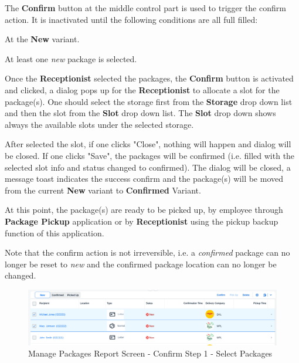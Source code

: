 The \textbf{Confirm} button at the middle control part is used to trigger the confirm action. It is inactivated until the following conditions are all full filled:

\begin{compactenum}
    \item At the \textbf{New} variant.
    \item At least one \textit{new} package is selected.
\end{compactenum}

\bigskip
Once the \textbf{Receptionist} selected the packages, the \textbf{Confirm} button is activated and clicked, a dialog pops up for the \textbf{Receptionist} to allocate a slot for the package(s). One should select the storage first from the \textbf{Storage} drop down list and then the slot from the \textbf{Slot} drop down list. The \textbf{Slot} drop down shows always the available slots under the selected storage.

After selected the slot, if one clicks "Close", nothing will happen and dialog will be closed. If one clicks "Save", the packages will be confirmed (i.e. filled with the selected slot info and status changed to confirmed). The dialog will be closed, a message toast indicates the success confirm and the package(s) will be moved from the current \textbf{New} variant to \textbf{Confirmed} Variant.

At this point, the package(s) are ready to be picked up, by employee through \textbf{Package Pickup} application or by \textbf{Receptionist} using the pickup backup function of this application.

\bigskip
Note that the confirm action is not irreversible, i.e. a \textit{confirmed} package can no longer be reset to \textit{new} and the confirmed package location can no longer be changed.

\begin{figure}[H]
	\centering
	\includegraphics[width=1\linewidth]{images/user_doc/managePack/ReportScreen/browse/confirmActivated.png}
	\caption{Manage Packages Report Screen - Confirm Step 1 - Select Packages}
	\label{fig:MPReportConfirmBtn}
\end{figure}

